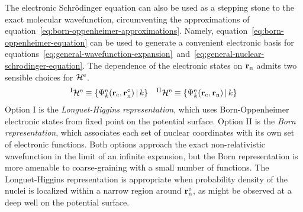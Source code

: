 \documentclass[11pt]{article}
\begin{document}
\begin{rmk}
\label{rmk:born-and-longuet-higgins-representations}
The electronic Schr\"odinger equation can also be used as a stepping stone to the exact molecular wavefunction, circumventing the approximations of equation~\ref{eq:born-oppenheimer-approximations}.
Namely, equation~\ref{eq:born-oppenheimer-equation} can be used to generate a convenient electronic basis for equations~\ref{eq:general-wavefunction-expansion}~and~\ref{eq:general-nuclear-schrodinger-equation}.
The dependence of the electronic states on $\mathbf{r}_{\mathrm{n}}$ admits two sensible choices for $\mathcal{H}^{\mathrm{e}}$.
\begin{align}
  {}^{\mathrm{I}}\mathcal{H}^{\mathrm{e}}
\equiv
  \{
    \Psi _k^{\mathrm{e}}(\mathbf{r}_{\mathrm{e}},\mathbf{r}_{\mathrm{n}}^\circ)
  \,|\,
    k
  \}
&&
  {}^{\mathrm{II}}\mathcal{H}^{\mathrm{e}}
\equiv
  \{
    \Psi _k^{\mathrm{e}}(\mathbf{r}_{\mathrm{e}},\mathbf{r}_{\mathrm{n}})
  \,|\,
    k
  \}
\end{align}
Option I is the \textit{Longuet-Higgins representation}, which uses Born-Oppenheimer electronic states from fixed point on the potential surface.
Option II is the \textit{Born representation}, which associates each set of nuclear coordinates with its own set of electronic functions.
Both options approach the exact non-relativistic wavefunction in the limit of an infinite expansion, but the Born representation is more amenable to coarse-graining with a small number of functions.
The Longuet-Higgins representation is appropriate when probability density of the nuclei is localized within a narrow region around $\mathbf{r}_{\mathrm{n}}^\circ$,
as might be observed at a deep well on the potential surface.
\end{rmk}
\end{document}
